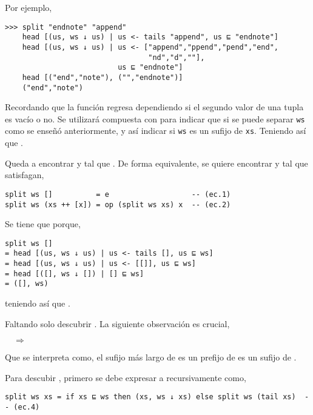 Por ejemplo,
\begin{verbatim}
>>> split "endnote" "append"
    head [(us, ws ↓ us) | us <- tails "append", us ⊑ "endnote"]
    head [(us, ws ↓ us) | us <- ["append","ppend","pend","end",
                                 "nd","d",""],
                          us ⊑ "endnote"]
    head [("end","note"), ("","endnote")]
    ("end","note")
\end{verbatim}

Recordando que la función  regresa  dependiendo si el segundo valor
de una tupla es vacío o no. Se utilizará compuesta con  para indicar que si se
puede separar \texttt{ws} como se enseñó anteriormente, y así indicar si \texttt{ws} es un sufijo
de \texttt{xs}. Teniendo así que .

Queda a encontrar  y  tal que . De forma
equivalente, se quiere encontrar  y  tal que satisfagan, 

\begin{verbatim}
split ws []          = e                   -- (ec.1)
split ws (xs ++ [x]) = op (split ws xs) x  -- (ec.2)
\end{verbatim}

Se tiene que  porque, 
\begin{verbatim}
split ws []
= head [(us, ws ↓ us) | us <- tails [], us ⊑ ws]
= head [(us, ws ↓ us) | us <- [[]], us ⊑ ws]
= head [([], ws ↓ []) | [] ⊑ ws]
= ([], ws)
\end{verbatim}

teniendo así que .

Faltando solo descubrir . La siguiente observación es crucial,

 $\quad\Longrightarrow\quad$ 

Que se interpreta como, el sufijo más largo de  es un prefijo de  es un
sufijo de .

Para descubir , primero se debe expresar a  recursivamente como,
\begin{verbatim}
split ws xs = if xs ⊑ ws then (xs, ws ↓ xs) else split ws (tail xs)  -- (ec.4)
\end{verbatim}

